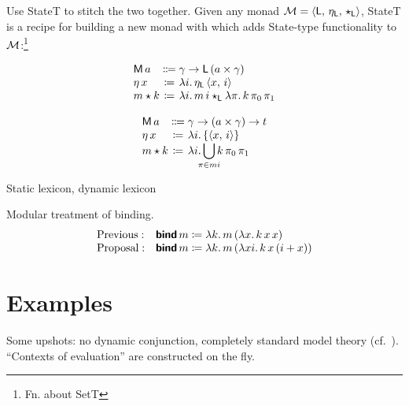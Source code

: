 	Use StateT to stitch the two together. Given any monad ${\cal M}= \langle \textsf{L},\,\eta_\textsf{L},\,\star_\textsf{L} \rangle$, StateT is a recipe for building a new monad with which adds State-type functionality to ${\cal M}$:\footnote{Fn. about SetT}%
	\begin{defi}\label{statet}
		\[\begin{array}[t]
			{@{}l@{}c@{}l@{}}
			\textsf{M}\,a &{}\Coloneqq{} &\gamma \ra \textsf{L}\,(a \times \gamma)%
			\\
			\eta\,x &{}\ceq{} &\lambda i .\,\eta_\textsf{L}\,\ab{x,\,i}
			\\
			m \star k &{}\ceq{} &\lambda i.\, m\,i\star_\textsf{L} \lambda \pi.\,k\,\pi_0\,\pi_1%
		\end{array}\]
	\end{defi}
	\begin{defi}\label{stateset}
		\[\begin{array}[t]
			{@{}l@{}c@{}l@{}}
			\textsf{M}\,a &{}\Coloneqq{} &\gamma \ra (a \times \gamma) \ra t%
			\\
			\eta\,x &{}\ceq{} &\lambda i.\left\{\ab{x,\,i}\right\}
			\\
			m \star k &{}\ceq{} &\lambda i.\displaystyle\bigcup_{\mathclap{\pi \in mi}}k\,\pi_0\,\pi_1%
		\end{array}\]
	\end{defi}

	Static lexicon, dynamic lexicon
	
	Modular treatment of binding.%
	\[\begin{array}{ll}
		\text{Previous}:& \bsf{bind}\,m \ceq \lambda k.\,m\,(\lambda x.\,k\,x\,x)%
		\\
		\text{Proposal}:& \bsf{bind}\,m \ceq \lambda k.\,m\,(\lambda xi.\,k\,x\,(i + x))%
	\end{array}\]

\section{Examples}
	Some upshots: no dynamic conjunction, completely standard model theory (cf.~\citealt{Groote:2006}). ``Contexts of evaluation'' are constructed on the fly. %
	

